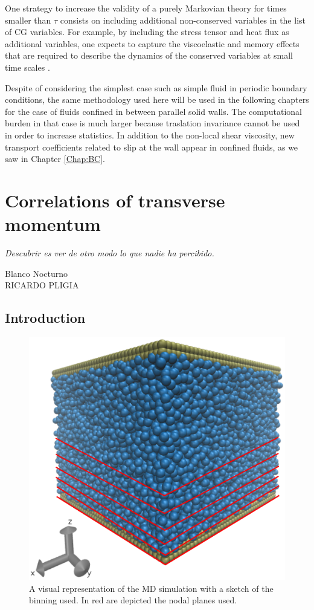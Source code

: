 \documentclass[a4paper,openright,12pt]{book}
\begin{document}
One strategy to increase the validity of a purely Markovian theory for
times   smaller  than   $\tau$   consists   on  including   additional
non-conserved variables in the list  of CG variables.  For example, by
including the stress tensor and heat flux as additional variables, one
expects  to  capture the  viscoelastic  and  memory effects  that  are
required to describe the dynamics  of the conserved variables at small
time scales \cite{Khayat1989,Mryglod1995,Bryk2010}.

Despite of considering the simplest case such as  simple fluid  in periodic  boundary conditions, the  same methodology used here  will be  used in the following chapters for  the case  of fluids
confined in between parallel solid walls.  The computational burden in
that case is much larger  because traslation invariance cannot be used
in order to increase statistics.
In  addition   to  the   non-local  shear  viscosity,   new  transport
coefficients related to slip at the wall appear in confined fluids, as
we saw in Chapter \ref{Chap:BC}.



\chapter{Correlations of transverse momentum}\label{Chap:Walls}
\epigraph{\textit{Descubrir es ver de otro modo lo que nadie ha percibido.}}{Blanco Nocturno \\ RICARDO PLIGIA}
\section{Introduction}



\begin{figure}
    \centering
    \includegraphics[scale=0.3]{system_nodes_walls}
    \caption[Walls box]{A visual representation of the MD simulation with a sketch of the binning used. In red are depicted the nodal planes used.}
    \label{fig:WallsBox}
\end{figure}
\end{document}
